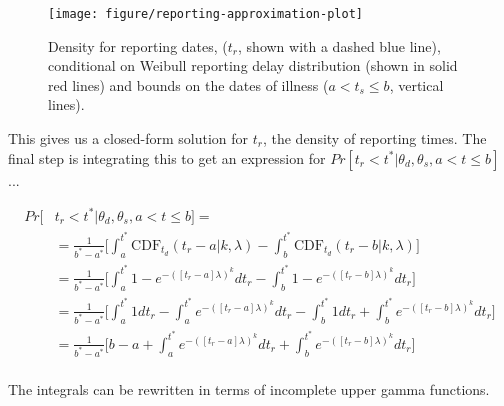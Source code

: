 \begin{knitrout}
\color{fgcolor}\begin{kframe}
\begin{alltt}
 \hlkwb{<-} \hlstd{(}\hlstd{=} \hlstd{))}
\end{alltt}
\end{kframe}\begin{figure}[]

\texttt{[image: figure/reporting-approximation-plot]} \caption[Density for reporting dates, ($t_r$, shown with a dashed blue line), conditional on Weibull reporting delay distribution (shown in solid red lines) and bounds on the dates of illness ($a < t_s \le  b$, vertical lines)]{Density for reporting dates, ($t_r$, shown with a dashed blue line), conditional on Weibull reporting delay distribution (shown in solid red lines) and bounds on the dates of illness ($a < t_s \le  b$, vertical lines).\label{fig:reporting-approximation-plot}}
\end{figure}


\end{knitrout}

This gives us a closed-form solution for $t_r$, the density of reporting
times.  The final step is integrating this to get an expression for
$Pr[t_r < t^*| \theta_d, \theta_s, a<t\le b]$...

\begin{align}
Pr[&t_r < t^*| \theta_d, \theta_s, a<t\le b] =  \\
	&= \frac{1}{b^*-a^*} \Bigg[ 
		\int_a^{t^*} \text{CDF}_{t_d}(t_r-a|k,\lambda) - 
		\int_b^{t^*} \text{CDF}_{t_d}(t_r-b|k,\lambda) 
		\Bigg] \\
	&= \frac{1}{b^*-a^*} \Bigg[ 
		\int_a^{t^*} 1-e^{-([t_r-a]\lambda)^k} dt_r - \int_b^{t^*} 1-e^{-([t_r-b]\lambda)^k} dt_r 
	\Bigg] \\
	&= \frac{1}{b^*-a^*} \Bigg[ 
		\int_a^{t^*} 1 dt_r - \int_a^{t^*} e^{-([t_r-a]\lambda)^k} dt_r -
		\int_b^{t^*} 1 dt_r + \int_b^{t^*} e^{-([t_r-b]\lambda)^k} dt_r 
	\Bigg] \\
	&= \frac{1}{b^*-a^*} \Bigg[
		b - a +
		\int_a^{t^*} e^{-([t_r-a]\lambda)^k} dt_r +
		\int_b^{t^*} e^{-([t_r-b]\lambda)^k} dt_r 
	\Bigg] \\
\end{align}

The integrals can be rewritten in terms of incomplete upper gamma
functions.

